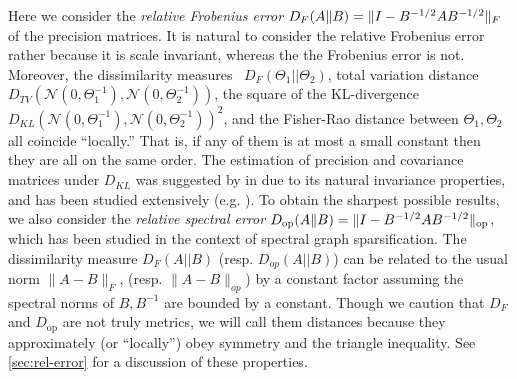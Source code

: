 \documentclass[aos]{imsart}
\theoremstyle{definition}
\numberwithin{equation}{section}
\DeclareMathOperator{\op}{op}
\DeclarePairedDelimiter{\norm}{\lVert}{\rVert}
\begin{document}
Here we consider the \emph{relative Frobenius error} $D_F(A \Vert B) = \norm{I - B^{-1/2} A B^{-1/2}}_F$ of the precision matrices. It is natural to consider the relative Frobenius error rather because it is scale invariant, whereas the the Frobenius error is not. Moreover, the dissimilarity measures ~$D_F(\Theta_1 || \Theta_2)$, total variation distance $D_{TV}(\mathcal{N}(0, \Theta_1^{-1}), \mathcal{N}(0, \Theta_2^{-1}))$, the square of the KL-divergence $D_{KL}(\mathcal{N}(0, \Theta_1^{-1}), \mathcal{N}(0, \Theta_2^{-1}))^2$, and the Fisher-Rao distance between $\Theta_1, \Theta_2$ all coincide ``locally.'' 
That is, if any of them is at most a small constant then they are all on the same order. The estimation of precision and covariance matrices under $D_{KL}$ was suggested by in \citep{james1992estimation} due to its natural invariance properties, and has been studied extensively (e.g. \cite{ledoit2012nonlinear}). 
To obtain the sharpest possible results, we also consider the \emph{relative spectral error} $D_{\op}(A \Vert B) = \norm{I - B^{-1/2} A B^{-1/2}}_{\op}$, which has been studied in the context of spectral graph sparsification.
The dissimilarity measure $D_F(A||B)$ (resp. $D_{op}(A||B)$) can be related to the usual norm $\|A - B\|_F$, (resp. $\|A - B\|_{op}$) by a constant factor assuming the spectral norms of $B, B^{-1}$ are bounded by a constant. Though we caution that $D_F$ and $D_{\op}$ are not truly metrics, we will call them distances because they approximately (or ``locally'') obey symmetry and the triangle inequality. See \cref{sec:rel-error} for a discussion of these properties.
\end{document}
